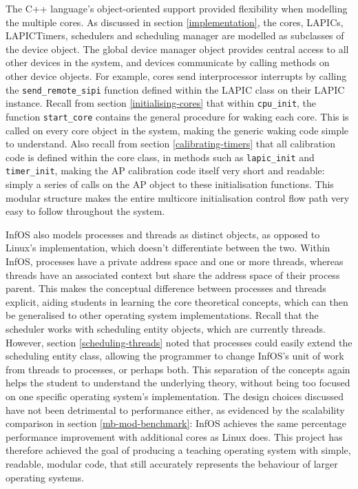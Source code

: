 \documentclass[bsc,frontabs,singlespacing,parskip,deptreport]{infthesis}
\begin{document}
The C++ language's object-oriented support provided flexibility when modelling the multiple cores. As discussed in section \ref{implementation}, the cores, LAPICs, LAPICTimers, schedulers and scheduling manager are modelled as subclasses of the device object. The global device manager object provides central access to all other devices in the system, and devices communicate by calling methods on other device objects. For example, cores send interprocessor interrupts by calling the \verb|send_remote_sipi| function defined within the LAPIC class on their LAPIC instance. Recall from section \ref{initialising-cores} that within \verb|cpu_init|, the function \verb|start_core| contains the general procedure for waking each core. This is called on every core object in the system, making the generic waking code simple to understand. Also recall from section \ref{calibrating-timers} that all calibration code is defined within the core class, in methods such as \verb|lapic_init| and \verb|timer_init|, making the AP calibration code itself very short and readable: simply a series of calls on the AP object to these initialisation functions. This modular structure makes the entire multicore initialisation control flow path very easy to follow throughout the system.

InfOS also models processes and threads as distinct objects, as opposed to Linux's implementation, which doesn't differentiate between the two. Within InfOS, processes have a private address space and one or more threads, whereas threads have an associated context but share the address space of their process parent. This makes the conceptual difference between processes and threads explicit, aiding students in learning the core theoretical concepts, which can then be generalised to other operating system implementations. Recall that the scheduler works with scheduling entity objects, which are currently threads. However, section \ref{scheduling-threads} noted that processes could easily extend the scheduling entity class, allowing the programmer to change InfOS's unit of work from threads to processes, or perhaps both. This separation of the concepts again helps the student to understand the underlying theory, without being too focused on one specific operating system's implementation. The design choices discussed have not been detrimental to performance either, as evidenced by the scalability comparison in section \ref{mb-mod-benchmark}: InfOS achieves the same percentage performance improvement with additional cores as Linux does. This project has therefore achieved the goal of producing a teaching operating system with simple, readable, modular code, that still accurately represents the behaviour of larger operating systems.
\end{document}
